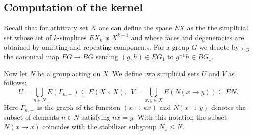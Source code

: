 \documentclass[oneside, 12pt]{amsart}
\theoremstyle{plain}
\numberwithin{equation}{section}
\numberwithin{lemma}{section}
\theoremstyle{remark}
\theoremstyle{definition}
\begin{document}
\subsection{Computation of the kernel} 
Recall that for arbitrary set $X$ one can define the space $EX$ as the the simplicial set whose set of $k$-simplices $EX_k$
 is $X^{k+1}$ and whose faces and degeneracies are obtained by omitting and repeating components. 
For a group $G$ we denote by $\pi_G$ the canonical map $EG \to BG$ sending $(g, h) \in EG_1$ to $g^{-1}h \in BG_1$.
 
Now let $N$ be a group acting on $X$. We define two simplicial sets $U$ and $V$ as follows:
\[ U = \bigcup\limits_{n\in N} E(\Gamma_{n.-}) \subseteq E(X\times X),\ \ V = \bigcup\limits_{x,y\in X}E(N(x\to y)) \subseteq EN. \]
Here $\Gamma_{n.-}$ is the graph of the function $(x \mapsto nx)$ and $N(x\to y)$ denotes the subset of elements $n\in N$ satisfying $nx=y$.
With this notation the subset $N(x\to x)$ coincides with the stabilizer subgroup $N_x \leq N$.
\end{document}
